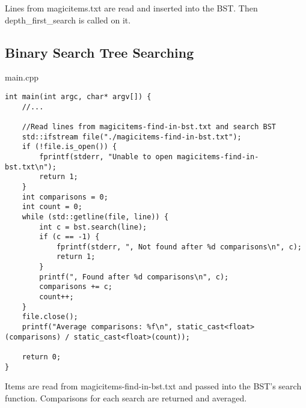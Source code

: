 \documentclass[letterpaper, 10pt,DIV=13]{scrartcl}
\numberwithin{equation}{section} %
\numberwithin{figure}{section} %
\numberwithin{table}{section} %
\begin{document}
Lines from magicitems.txt are read and inserted into the BST. Then depth\_first\_search is called on it.

\subsection{Binary Search Tree Searching}

main.cpp
\begin{verbatim}
int main(int argc, char* argv[]) {
    //...
    
    //Read lines from magicitems-find-in-bst.txt and search BST
    std::ifstream file("./magicitems-find-in-bst.txt");
    if (!file.is_open()) {
        fprintf(stderr, "Unable to open magicitems-find-in-bst.txt\n");
        return 1;
    }
    int comparisons = 0;
    int count = 0;
    while (std::getline(file, line)) {
        int c = bst.search(line);
        if (c == -1) {
            fprintf(stderr, ", Not found after %d comparisons\n", c);
            return 1;
        }
        printf(", Found after %d comparisons\n", c);
        comparisons += c;
        count++;
    }
    file.close();
    printf("Average comparisons: %f\n", static_cast<float>(comparisons) / static_cast<float>(count));

    return 0;
}
\end{verbatim}

Items are read from magicitems-find-in-bst.txt and passed into the BST's search function. Comparisons for
each search are returned and averaged. 
\end{document}

